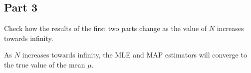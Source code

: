 \subsection{Part 3}
Check how the results of the first two parts change as the value of $N$ increases towards infinity.

\begin{qsolve}
	\begin{qsolve}[]
		As $N$ increases towards infinity, the MLE and MAP estimators will converge to the true value of the mean $\mu$.
	\end{qsolve}
\end{qsolve}
